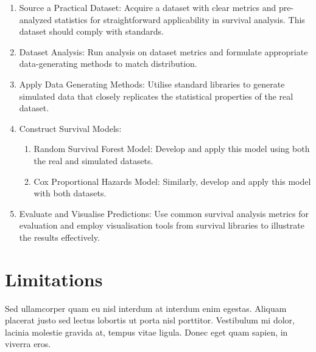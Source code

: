 \begin{enumerate}
	\item Source a Practical Dataset: Acquire a dataset with clear metrics and pre-analyzed statistics for straightforward applicability in survival analysis. This dataset should comply with standards. 
	\item Dataset Analysis: Run analysis on dataset metrics and formulate appropriate data-generating methods to match distribution.
	\item Apply Data Generating Methods: Utilise standard libraries to generate simulated data that closely replicates the statistical properties of the real dataset.
	\item Construct Survival Models:
	\begin{enumerate}
		\item Random Survival Forest Model: Develop and apply this model using both the real and simulated datasets.
		\item Cox Proportional Hazards Model: Similarly, develop and apply this model with both datasets.
	\end{enumerate}
	\item Evaluate and Visualise Predictions: Use common survival analysis metrics for evaluation and employ visualisation tools from survival libraries to illustrate the results effectively.
\end{enumerate}
 
\section{Limitations}

Sed ullamcorper quam eu nisl interdum at interdum enim egestas. Aliquam placerat justo sed lectus lobortis ut porta nisl porttitor. Vestibulum mi dolor, lacinia molestie gravida at, tempus vitae ligula. Donec eget quam sapien, in viverra eros.

\par\vspace{0.5cm}
\noindent {}\\

